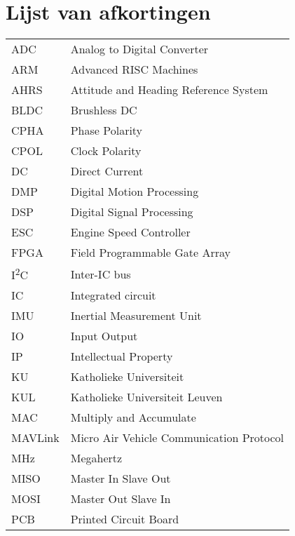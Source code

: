 \listoffiguresandtables
\chapter{Lijst van afkortingen}

\begin{flushleft}
  \renewcommand{\arraystretch}{1.1}
  \begin{tabularx}{\textwidth}{@{}p{12mm}X@{}}
			ADC 					& Analog to Digital Converter\\
			ARM 					& Advanced RISC Machines\\			
			AHRS					& Attitude and Heading Reference System\\
			BLDC					& Brushless DC\\
			CPHA					& Phase Polarity\\
			CPOL					& Clock Polarity\\
			DC						& Direct Current \\
			DMP						& Digital Motion Processing\\
			DSP 					& Digital Signal Processing\\		
			ESC						& Engine Speed Controller\\
			FPGA					& Field Programmable Gate Array 	\\
			I\textsuperscript{2}C 	& Inter-IC bus\\		
			IC 						& Integrated circuit\\		
			IMU						& Inertial Measurement Unit\\
			IO						& Input Output\\
			IP						& Intellectual Property\\
			KU 						& Katholieke Universiteit\\		
			KUL 					& Katholieke Universiteit Leuven\\		
			MAC 					& Multiply and Accumulate\\		
			MAVLink					& Micro Air Vehicle Communication Protocol	\\
			MHz 					& Megahertz\\		
			MISO					& Master In Slave Out\\
			MOSI					& Master Out Slave In\\
			PCB 					& Printed Circuit Board\\		

\end{tabularx}
\end{flushleft}
